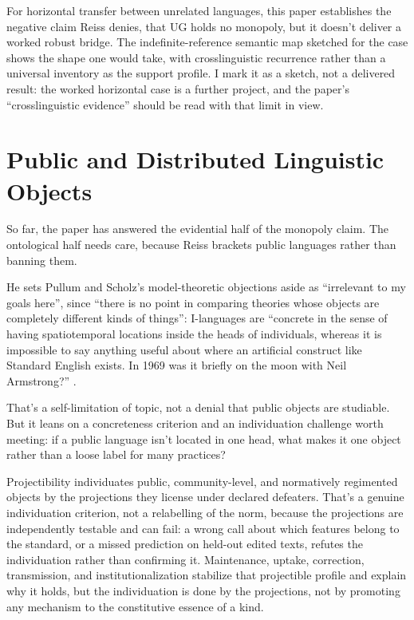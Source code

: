 \documentclass[12pt]{article}
\begin{document}
For horizontal transfer between unrelated languages, this paper establishes the negative claim Reiss denies, that UG holds no monopoly, but it doesn't deliver a worked robust bridge. The indefinite-reference semantic map sketched for the  case shows the shape one would take, with crosslinguistic recurrence rather than a universal inventory as the support profile. I mark it as a sketch, not a delivered result: the worked horizontal case is a further project, and the paper's \enquote{crosslinguistic evidence} should be read with that limit in view.

\section{Public and Distributed Linguistic Objects}

So far, the paper has answered the evidential half of the monopoly claim. The ontological half needs care, because Reiss brackets public languages rather than banning them.

He sets Pullum and Scholz's model-theoretic objections aside as \enquote{irrelevant to my goals here}, since \enquote{there is no point in comparing theories whose objects are completely different kinds of things}: I-languages are \enquote{concrete in the sense of having spatiotemporal locations inside the heads of individuals, whereas it is impossible to say anything useful about where an artificial construct like Standard English exists. In 1969 was it briefly on the moon with Neil Armstrong?} \citep[sec.~2]{reiss2026armchair}.

That's a self-limitation of topic, not a denial that public objects are studiable. But it leans on a concreteness criterion and an individuation challenge worth meeting: if a public language isn't located in one head, what makes it one object rather than a loose label for many practices?

Projectibility individuates public, community-level, and normatively regimented objects by the projections they license under declared defeaters. That's a genuine individuation criterion, not a relabelling of the norm, because the projections are independently testable and can fail: a wrong call about which features belong to the standard, or a missed prediction on held-out edited texts, refutes the individuation rather than confirming it. Maintenance, uptake, correction, transmission, and institutionalization stabilize that projectible profile and explain why it holds, but the individuation is done by the projections, not by promoting any mechanism to the constitutive essence of a kind.
\end{document}
